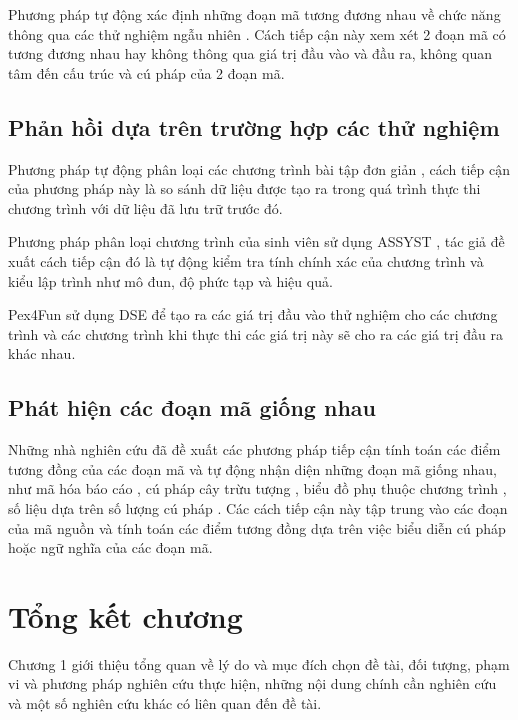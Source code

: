 	Phương pháp tự động xác định những đoạn mã tương đương nhau về chức năng thông qua các thử nghiệm ngẫu nhiên \cite{jiang2009automatic}. Cách tiếp cận này xem xét 2 đoạn mã có tương đương nhau hay không thông qua giá trị đầu vào và đầu ra, không quan tâm đến cấu trúc và cú pháp của 2 đoạn mã.
	
	\subsection*{Phản hồi dựa trên trường hợp các thử nghiệm}
	Phương pháp tự động phân loại các chương trình bài tập đơn giản \cite{hext1969automatic}, cách tiếp cận của phương pháp này là so sánh dữ liệu được tạo ra trong quá trình thực thi chương trình với dữ liệu đã lưu trữ trước đó. 
	
	Phương pháp phân loại chương trình của sinh viên sử dụng ASSYST \cite{jackson1997grading}, tác giả đề xuất cách tiếp cận đó là tự động kiểm tra tính chính xác của chương trình và kiểu lập trình như mô đun, độ phức tạp và hiệu quả.
	
	Pex4Fun sử dụng DSE để tạo ra các giá trị đầu vào thử nghiệm cho các chương trình và các chương trình khi thực thi các giá trị này sẽ cho ra các giá trị đầu ra khác nhau.
	
	\subsection*{Phát hiện các đoạn mã giống nhau}
	Những nhà nghiên cứu đã đề xuất các phương pháp tiếp cận tính toán các điểm tương đồng của các đoạn mã và tự động nhận diện những đoạn mã giống nhau, như mã hóa báo cáo \cite{kamiya2002ccfinder}, cú pháp cây trừu tượng \cite{baxter1998clone}, biểu đồ phụ thuộc chương trình \cite{komondoor2001using}, số liệu dựa trên số lượng cú pháp \cite{dang2012xiao} \cite{merlo2004linear}. Các cách tiếp cận này tập trung vào các đoạn của mã nguồn và tính toán các điểm tương đồng dựa trên việc biểu diễn cú pháp hoặc ngữ nghĩa của các đoạn mã.
	 
	
	
\section*{Tổng kết chương}
Chương 1 giới thiệu tổng quan về lý do và mục đích chọn đề tài, đối tượng, phạm vi và phương pháp nghiên cứu thực hiện, những nội dung chính cần nghiên cứu và một số nghiên cứu khác có liên quan đến đề tài.





